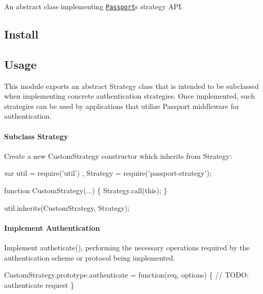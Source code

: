 \href{http://travis-ci.org/jaredhanson/passport-strategy}{\tt } \href{https://coveralls.io/r/jaredhanson/passport-strategy}{\tt } \href{http://david-dm.org/jaredhanson/passport-strategy}{\tt }

An abstract class implementing \href{http://passportjs.org/}{\tt Passport}\textquotesingle{}s strategy A\+PI.

\subsection*{Install}



\subsection*{Usage}

This module exports an abstract {\ttfamily Strategy} class that is intended to be subclassed when implementing concrete authentication strategies. Once implemented, such strategies can be used by applications that utilize Passport middleware for authentication.

\paragraph*{Subclass Strategy}

Create a new {\ttfamily Custom\+Strategy} constructor which inherits from {\ttfamily Strategy}\+:


\begin{DoxyCode}
var util = require('util')
  , Strategy = require('passport-strategy');

function CustomStrategy(...) \{
  Strategy.call(this);
\}

util.inherits(CustomStrategy, Strategy);
\end{DoxyCode}


\paragraph*{Implement Authentication}

Implement {\ttfamily autheticate()}, performing the necessary operations required by the authentication scheme or protocol being implemented.


\begin{DoxyCode}
CustomStrategy.prototype.authenticate = function(req, options) \{
  // TODO: authenticate request
\}
\end{DoxyCode}


